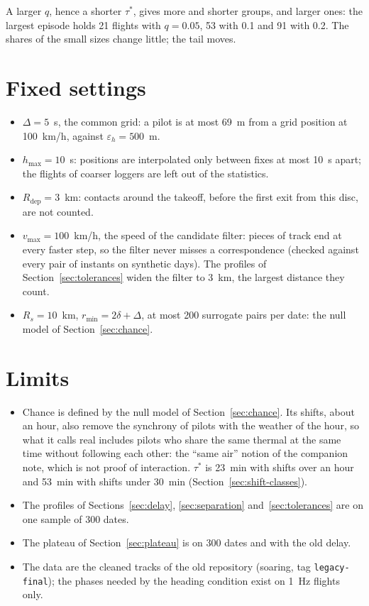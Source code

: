 \documentclass[11pt,a4paper]{article}
\begin{document}
A larger $q$, hence a shorter $\tau^*$, gives more and shorter groups, and larger ones: the
largest episode holds 21 flights with $q=0.05$, 53 with 0.1 and 91 with 0.2. The shares of the
small sizes change little; the tail moves.

\section{Fixed settings}\label{sec:fixed}

\begin{itemize}[leftmargin=1.2em]
\item $\Delta=5$~s, the common grid: a pilot is at most 69~m from a grid position at
  100~km/h, against $\varepsilon_h=500$~m.
\item $h_{\max}=10$~s: positions are interpolated only between fixes at most 10~s apart; the
  flights of coarser loggers are left out of the statistics.
\item $R_\mathrm{dep}=3$~km: contacts around the takeoff, before the first exit from this disc,
  are not counted.
\item $v_{\max}=100$~km/h, the speed of the candidate filter: pieces of track end at every
  faster step, so the filter never misses a correspondence (checked against every pair of
  instants on synthetic days). The profiles of Section~\ref{sec:tolerances} widen the filter to
  3~km, the largest distance they count.
\item $R_s=10$~km, $r_{\min}=2\delta+\Delta$, at most 200 surrogate pairs per date: the null
  model of Section~\ref{sec:chance}.
\end{itemize}

\section{Limits}

\begin{itemize}[leftmargin=1.2em]
\item Chance is defined by the null model of Section~\ref{sec:chance}. Its shifts, about an
  hour, also remove the synchrony of pilots with the weather of the hour, so what it calls real
  includes pilots who share the same thermal at the same time without following each other:
  the ``same air'' notion of the companion note, which is not proof of interaction. $\tau^*$
  is 23~min with shifts over an hour and 53~min with shifts under 30~min
  (Section~\ref{sec:shift-classes}).
\item The profiles of Sections~\ref{sec:delay}, \ref{sec:separation} and~\ref{sec:tolerances}
  are on one sample of 300 dates.
\item The plateau of Section~\ref{sec:plateau} is on 300 dates and with the old delay.
\item The data are the cleaned tracks of the old repository (soaring, tag
  \texttt{legacy-final}); the phases needed by the heading condition exist on 1~Hz flights
  only.
\end{itemize}
\end{document}
